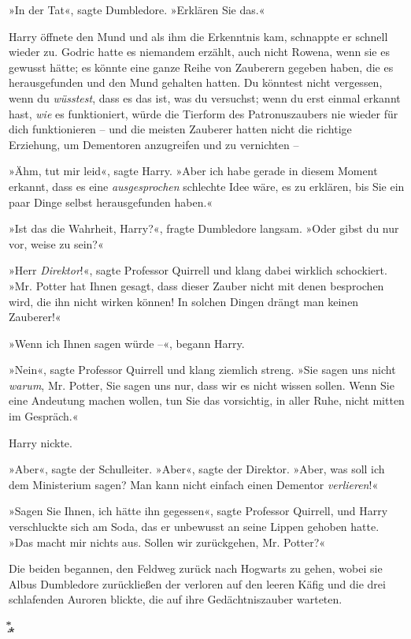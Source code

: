 {»In der Tat«, sagte Dumbledore. »Erklären Sie das.«

Harry öffnete den Mund und als ihm die Erkenntnis kam, schnappte er schnell wieder zu. Godric hatte es niemandem erzählt, auch nicht Rowena, wenn sie es gewusst hätte; es könnte eine ganze Reihe von Zauberern gegeben haben, die es herausgefunden und den Mund gehalten hatten. Du könntest nicht vergessen, wenn du \emph{wüsstest}, dass es das ist, was du versuchst; wenn du erst einmal erkannt hast, \emph{wie} es funktioniert, würde die Tierform des Patronuszaubers nie wieder für dich funktionieren -- und die meisten Zauberer hatten nicht die richtige Erziehung, um Dementoren anzugreifen und zu vernichten --

»Ähm, tut mir leid«, sagte Harry. »Aber ich habe gerade in diesem Moment erkannt, dass es eine \emph{ausgesprochen} schlechte Idee wäre, es zu erklären, bis Sie ein paar Dinge selbst herausgefunden haben.«

»Ist das die Wahrheit, Harry?«, fragte Dumbledore langsam. »Oder gibst du nur vor, weise zu sein?«

»Herr \emph{Direktor}!«, sagte Professor Quirrell und klang dabei wirklich schockiert. »Mr. Potter hat Ihnen gesagt, dass dieser Zauber nicht mit denen besprochen wird, die ihn nicht wirken können! In solchen Dingen drängt man keinen Zauberer!«

»Wenn ich Ihnen sagen würde --«, begann Harry.

»Nein«, sagte Professor Quirrell und klang ziemlich streng. »Sie sagen uns nicht \emph{warum}, Mr. Potter, Sie sagen uns nur, dass wir es nicht wissen sollen. Wenn Sie eine Andeutung machen wollen, tun Sie das vorsichtig, in aller Ruhe, nicht mitten im Gespräch.«

Harry nickte.

»Aber«, sagte der Schulleiter. »Aber«, sagte der Direktor. »Aber, was soll ich dem Ministerium sagen? Man kann nicht einfach einen Dementor \emph{verlieren}!«

»Sagen Sie Ihnen, ich hätte ihn gegessen«, sagte Professor Quirrell, und Harry verschluckte sich am Soda, das er unbewusst an seine Lippen gehoben hatte. »Das macht mir nichts aus. Sollen wir zurückgehen, Mr. Potter?«

Die beiden begannen, den Feldweg zurück nach Hogwarts zu gehen, wobei sie Albus Dumbledore zurückließen der verloren auf den leeren Käfig und die drei schlafenden Auroren blickte, die auf ihre Gedächtniszauber warteten.

͙⃰⁎

}
